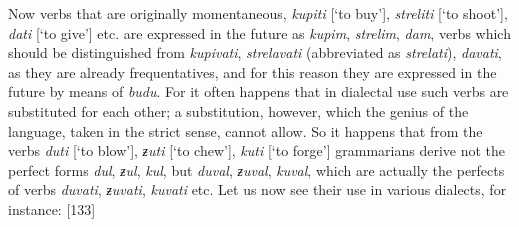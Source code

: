 Now verbs that are originally momentaneous, \textit{kupiti} [‘to buy’], \textit{streliti} [‘to shoot’], \textit{dati} [‘to give’] etc. are expressed in the future as \textit{kupim}, \textit{strelim}, \textit{dam}, verbs which should be distinguished from \textit{kupivati}, \textit{strelavati} (abbreviated as \textit{strelati}), \textit{davati}, as they are already frequentatives, and for this reason they are expressed in the future by means of \textit{budu}. For it often happens that in dialectal use such verbs are substituted for each other; a substitution, however, which the genius of the language, taken in the strict sense, cannot allow. So it happens that from the verbs \textit{duti} [‘to blow’], \textit{ƶuti} [‘to chew’], \textit{kuti} [‘to forge’] grammarians derive not the perfect forms \textit{dul}, \textit{ƶul}, \textit{kul}, but \textit{duval}, \textit{ƶuval}, \textit{kuval}, which are actually the perfects of verbs \textit{duvati}, \textit{ƶuvati}, \textit{kuvati} etc. Let us now see their use in various dialects, for instance: [133] 

